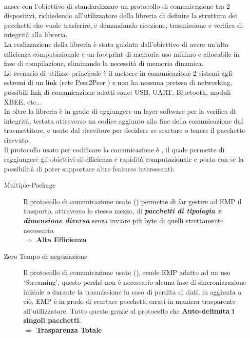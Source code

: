 \paragraph{\cite*{EMP}} nasce con l’obiettivo di standardizzare un protocollo di comunicazione tra 2 dispositivi, richiedendo all'utilizzatore della libreria di definire la struttura dei pacchetti che vuole trasferire, e demandando ricezione, trasmissione e verifica di integrità alla libreria.\\
La realizzazione della libreria è stata guidata dall'obiettivo di avere un'alta efficienza computazionale e un footprint di memoria uso minimo e allocabile in fase di compilazione, eliminando la necessità di memoria dinamica.\\
Lo scenario di utilizzo principale è il mettere in comunicazione 2 sistemi agli estremi di un link (rete Peer2Peer ) e non ha nessuna pretesa di networking, possibili link di comunicazione adatti sono: USB, UART, Bluetooth, moduli XBEE, etc...\\
In oltre la libreria è in grado di aggiungere un layer software per la verifica di integrità, testata attraverso un codice \cite*{CRC8} aggiunto alla fine della comunicazione dal trasmettitore, e usato dal ricevitore per decidere se scartare o tenere il pacchetto ricevuto.\\
Il protocollo usato per codificare la comunicazione è \cite*{COBS}, il quale permette di raggiungere gli obiettivi di efficienza e rapidità computazionale e porta con se la possibilità di poter supportare altre features interessanti:
\begin{spacing}{1.25}
	\begin{description}
		\item[Multiple-Package] Il protocollo di comunicazione usato (\cite{COBS}) permette di far gestire ad EMP il trasporto, attraverso lo stesso mezzo, di \textit{\textbf{pacchetti di tipologia e dimensione diversa}} senza inviare più byte di quelli strettamente necessario.\\
		\phantom{.}\hfill$\Rightarrow$ \textbf{Alta Efficienza}
		\item[Zero Tempo di negoziazione] Il protocollo di comunicazione usato (\cite{COBS}), rende EMP adatto ad un uso ‘Streaming’, questo perché non è necessario alcuna fase di sincronizzazione iniziale o durante la trasmissione in caso di perdita di dati, in aggiunta a ciò, EMP è in grado di scartare pacchetti errati in maniera trasparente all’utilizzatore. Tutto questo grazie al protocollo che \textbf{Auto-delimita i singoli pacchetti}.\\
		\phantom{.}\hfill$\Rightarrow$ \textbf{Trasparenza Totale}

	\end{description}
\end{spacing}

